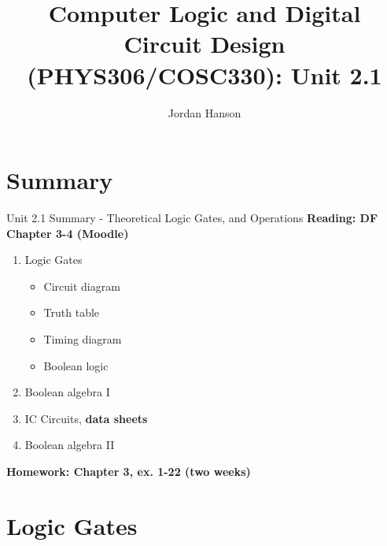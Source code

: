 \documentclass{beamer}
\title{Computer Logic and Digital Circuit Design (PHYS306/COSC330): Unit 2.1}
\author{Jordan Hanson}
\institute{Whittier College Department of Physics and Astronomy}
\begin{document}
\maketitle

\section{Summary}

\begin{frame}{Unit 2.1 Summary - Theoretical Logic Gates, and Operations}
\textbf{Reading: DF Chapter 3-4 (Moodle)}
\begin{enumerate}
\item Logic Gates
\begin{itemize}
\item Circuit diagram
\item Truth table
\item Timing diagram
\item Boolean logic
\end{itemize}
\item \alert{Boolean algebra I}
\item IC Circuits, \textbf{data sheets}
\item \alert{Boolean algebra II}
\end{enumerate}
\textbf{Homework: Chapter 3, ex. 1-22 (two weeks)}
\end{frame}

\section{Logic Gates}
\end{document}
